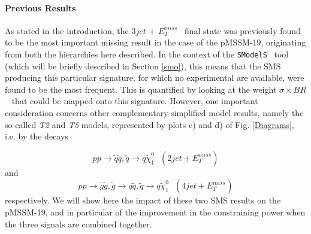 \documentclass[a4paper,11pt]{article}
\newcommand{\MET}{{ $E_T ^{miss}$}}
\newcommand{\SMO}{\texttt{SModelS\xspace}}
\newcommand{\WEIGHT}{$\sigma \times BR$\xspace}
\begin{document}
\paragraph{Previous Results}
As stated in the introduction, the $3jet$ + \MET~ final state was previously found to be the most important missing result in the case of the pMSSM-19, originating from both the hierarchies here described. In the context of the \SMO~ tool (which will be briefly described in Section \ref{smo}), this means that the SMS producing this particular signature, for which no experimental are available, were found to be the most frequent. This is quantified by looking at the weight \WEIGHT~ that could be mapped onto this signature.
However, one important consideration concerns other complementary simplified model results, namely the so called \textit{T2} and \textit{T5} models, represented by plots c) and d) of Fig. \ref{Diagrams}, i.e. by the decays

\begin{equation}
p p \rightarrow \tilde q \tilde q ,\tilde q \rightarrow q \tilde \chi _1 ^0  \ \ \ (2jet + E_T^{miss})
\end{equation}
and
\begin{equation}
p p \rightarrow \tilde g \tilde g , \tilde g \rightarrow q  \tilde q , \tilde q \rightarrow q \tilde \chi _1 ^0 \ \ \ (4jet + E_T^{miss})
\end{equation}
respectively. We will show here the impact of these two SMS results on the pMSSM-19, and in particular of the improvement in the constraining power when the three signals are combined together.  
\end{document}
